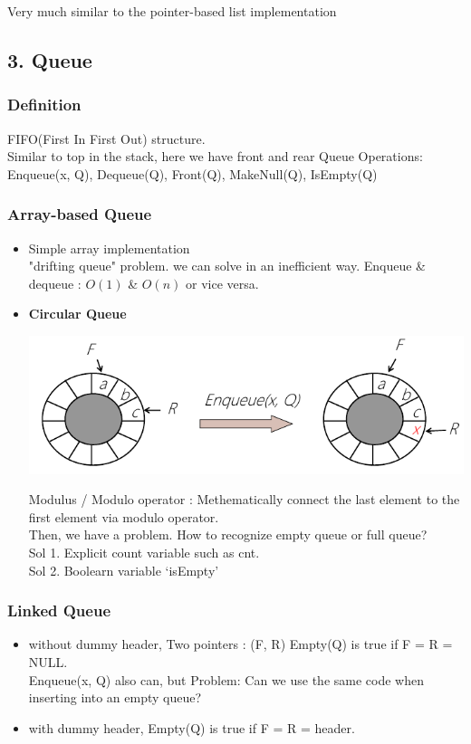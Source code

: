 \begin{section}
Very much similar to the pointer-based list implementation


\subsection*{3. Queue}

\subsubsection*{Definition}

FIFO(First In First Out) structure. \\
Similar to top in the stack, here we have front and rear
\medskip
\noindent Queue Operations: Enqueue(x, Q), Dequeue(Q), Front(Q), MakeNull(Q), IsEmpty(Q)

\subsubsection*{Array-based Queue}
\begin{itemize}
    \item Simple array implementation \\ "drifting queue" problem. we can solve in an inefficient way. Enqueue \& dequeue : $O(1)$ \& $O(n)$ or vice versa.

    \item \textbf{Circular Queue} 
    \begin{center}
        \includegraphics[scale = 0.7]{img/arraybasedqueue.png}
    \end{center}
    Modulus / Modulo operator : Methematically connect the last element to the first element via modulo operator. \\
    Then, we have a problem. How to recognize empty queue or full queue?\\
    Sol 1. Explicit count variable such as cnt. \\ Sol 2. Boolearn variable `isEmpty'
\end{itemize}

\subsubsection*{Linked Queue}
\begin{itemize}
    \item without dummy header,
    Two pointers : (F, R) Empty(Q) is true if F = R = NULL. \\ Enqueue(x, Q) also can, but Problem: Can we use the same code when inserting into an empty queue?
    \item with dummy header,
    Empty(Q) is true if F = R = header.
\end{itemize}


\end{section}
